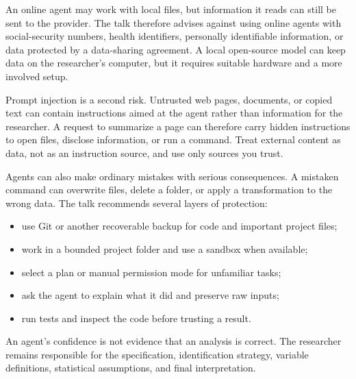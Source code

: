 \documentclass[
  english,
  10pt,
]{article}
\providecommand{\tightlist}{%
  \setlength{\itemsep}{0pt}\setlength{\parskip}{0pt}}
\begin{document}
An online agent may work with local files, but information it reads can
still be sent to the provider. The talk therefore advises against using
online agents with social-security numbers, health identifiers,
personally identifiable information, or data protected by a data-sharing
agreement. A local open-source model can keep data on the researcher's
computer, but it requires suitable hardware and a more involved setup.

Prompt injection is a second risk. Untrusted web pages, documents, or
copied text can contain instructions aimed at the agent rather than
information for the researcher. A request to summarize a page can
therefore carry hidden instructions to open files, disclose information,
or run a command. Treat external content as data, not as an instruction
source, and use only sources you trust.

Agents can also make ordinary mistakes with serious consequences. A
mistaken command can overwrite files, delete a folder, or apply a
transformation to the wrong data. The talk recommends several layers of
protection:

\begin{itemize}
\tightlist
\item
  use Git or another recoverable backup for code and important project
  files;
\item
  work in a bounded project folder and use a sandbox when available;
\item
  select a plan or manual permission mode for unfamiliar tasks;
\item
  ask the agent to explain what it did and preserve raw inputs;
\item
  run tests and inspect the code before trusting a result.
\end{itemize}

\begin{tcolorbox}[enhanced jigsaw, arc=.35mm, bottomrule=.15mm, bottomtitle=1mm, breakable, colback=white, colbacktitle=quarto-callout-warning-color!10!white, colframe=quarto-callout-warning-color-frame, coltitle=black, left=2mm, leftrule=.75mm, opacityback=0, opacitybacktitle=0.6, rightrule=.15mm, title=\textcolor{quarto-callout-warning-color}{\faExclamationTriangle}\hspace{0.5em}{Warning}, titlerule=0mm, toprule=.15mm, toptitle=1mm]

An agent's confidence is not evidence that an analysis is correct. The
researcher remains responsible for the specification, identification
strategy, variable definitions, statistical assumptions, and final
interpretation.

\end{tcolorbox}
\end{document}
